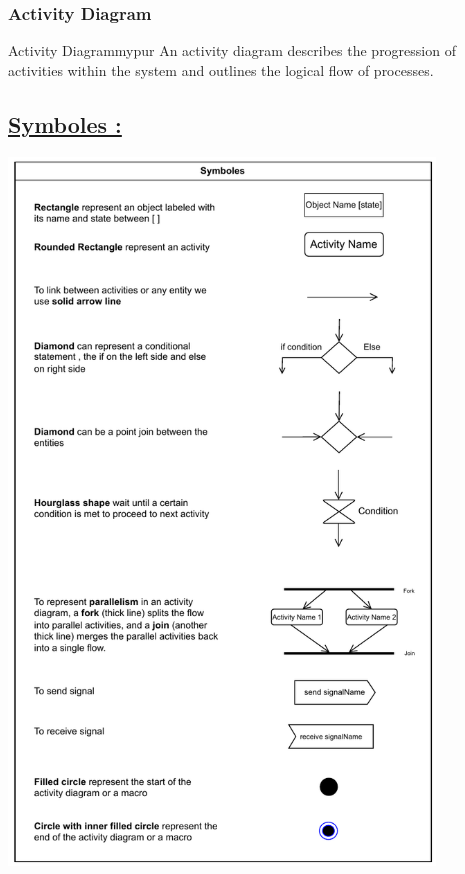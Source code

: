 \vspace{1cm}
\subsubsection{Activity Diagram}

\begin{prettyBox}{Activity Diagram}{mypur}
An activity diagram describes the progression of activities within the system and outlines the logical flow of processes.
\end{prettyBox}

\subsection*{\underline{Symboles :}}

\begin{center}
\includegraphics[width=0.85\textwidth,height=0.97\textheight]{Chapters/Diagram/AC/sym.drawio.pdf}
\end{center}


